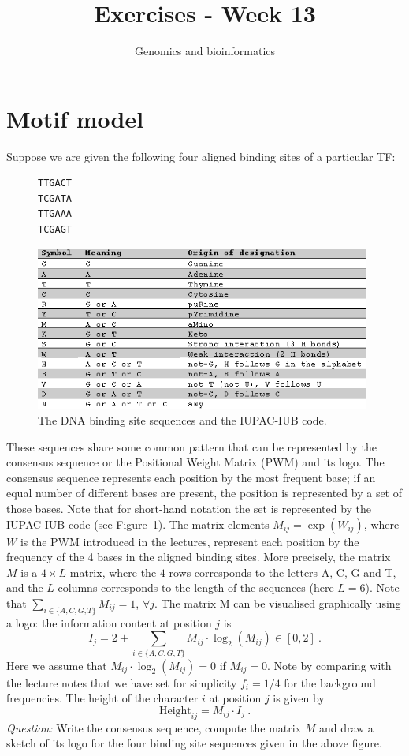 \documentclass[a4paper,11pt]{article}
\begin{document}
\title{Exercises - Week 13}
\date{}
\author{Genomics and bioinformatics}
\maketitle

\section{Motif model}

\noindent Suppose we are given the following four aligned binding sites of a particular TF:

\begin{figure}[h!]
\centering
\begin{BVerbatim}
TTGACT
TCGATA
TTGAAA
TCGAGT
\end{BVerbatim}
\hspace{15mm}\includegraphics[width=11cm]{IUPAC.png}
\caption{The DNA binding site sequences and the IUPAC-IUB code.}
\end{figure}

\noindent These sequences share some common pattern that can be represented by the consensus sequence or the Positional Weight Matrix (PWM) and its logo. The consensus sequence represents each position by the most frequent base; if an equal number of different bases are present, the position is represented by a set of those bases. Note that for short-hand notation the set is represented by the IUPAC-IUB code (see Figure~1).  The matrix elements $M_{ij} = \exp(W_{ij})$, where $W$ is the PWM introduced in the lectures, represent each position by the frequency of the 4 bases in the aligned binding sites. More precisely, the matrix $M$ is a $4 \times L$ matrix, where the $4$ rows corresponds to the letters A, C, G and T, and the $L$ columns corresponds to the length of the sequences (here $L=6$). Note that $\sum_{i \in \{A, C, G, T\}} M_{ij} = 1$, $\forall j$. The matrix M can be visualised graphically using a logo: the information content at position $j$ is
$$
I_j = 2 + \sum_{i \in \{A, C, G, T\}} M_{ij} \cdot \log_2(M_{ij}) \in [0,2] ~.
$$
Here we assume that $M_{ij} \cdot \log_2(M_{ij})=0$ if $M_{ij}=0$. Note by comparing with the lecture notes that we have set for simplicity $f_i = 1/4$ for the background frequencies. The height of the character $i$ at position $j$ is given by 
$$
\mbox{Height}_{ij} = M_{ij} \cdot I_j~.
$$
\noindent \textit{Question:} Write the consensus sequence, compute the matrix $M$ and draw a sketch of its logo for the four binding site sequences given in the above figure.\\
\end{document}
